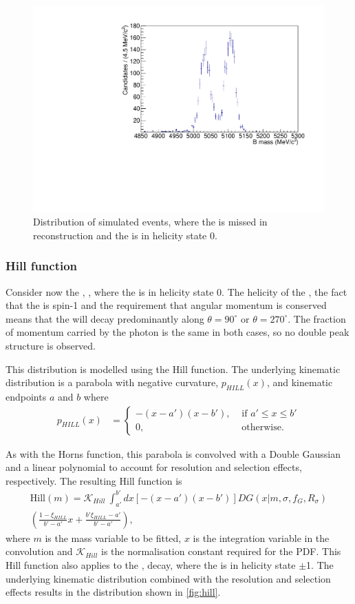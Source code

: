 \begin{figure}[h]
\centering
\includegraphics[width=0.5\linewidth]{figures/fitComponents/horns.pdf}
\caption{Distribution of simulated \decay{\Bm}{(\decay{\Dstarz}{\Dz\piz})\Kstarm} events, where the \piz is missed in reconstruction and the \Dstarz is in helicity state 0.}
\label{fig:horns}
\end{figure}

\subsubsection{Hill function}

Consider now the \decay{\Bm}{\Dstarz\Kstarm}, \decay{\Dstarz}{\Dz\gamma}, where the \Dstarz is in helicity state 0. The helicity of the \Dstarz, the fact that the \Pgamma is spin-1 and the requirement that angular momentum is conserved means that the \Pgamma will decay predominantly along $\theta = 90^{\circ}$ or $\theta = 270^{\circ}$. The fraction of momentum carried by the photon is the same in both cases, so no double peak structure is observed.

This distribution is modelled using the Hill function. The underlying kinematic distribution is a parabola with negative curvature, $p_{HILL}(x)$, and kinematic endpoints $a$ and $b$ where
\begin{align}
p_{HILL}(x) &= \begin{cases}
-(x - a')(x - b'), & \text{ if $a' \leq x \leq b'$}\\ 	
0, & \text{ otherwise.}
\end{cases} 
\end{align}

As with the Horns function, this parabola is convolved with a Double Gaussian and a linear polynomial to account for resolution and selection effects, respectively. The resulting Hill function is
\begin{multline}
\text{Hill}(m) = \mathcal{K}_{Hill}\ \int_{a'}^{b'} dx \left[-(x - a')(x - b')\right] DG(x|m,\sigma,f_G,R_{\sigma}) \\
\left( \frac{1 - \xi_{HILL}}{b' - a'}x + \frac{b'\xi_{HILL} - a'}{b' - a'}\right),
\label{eqn:hill}
\end{multline}
where $m$ is the mass variable to be fitted, $x$ is the integration variable in the convolution and $\mathcal{K}_{Hill}$ is the normalisation constant required for the PDF. This Hill function also applies to the \decay{\Bm}{\Dstarz\Kstarm}, \decay{\Dstarz}{\Dz\piz} decay, where the \Dstarz is in helicity state $\pm$1. The underlying kinematic distribution combined with the resolution and selection effects results in the distribution shown in \fig\ref{fig:hill}.

